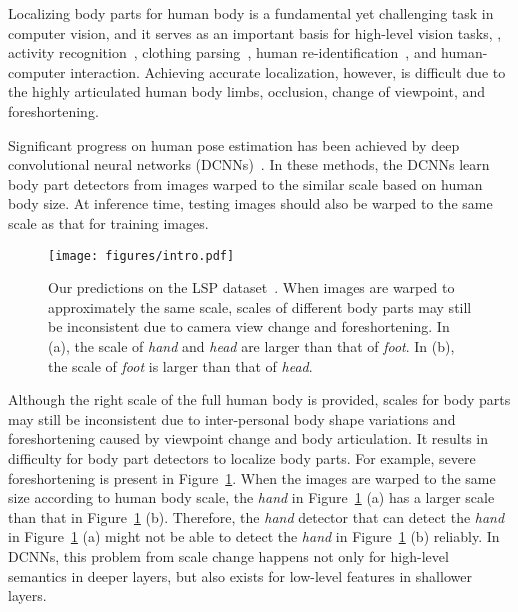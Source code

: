 \documentclass[10pt,twocolumn,letterpaper]{article}
\begin{document}
Localizing body parts for human body is a fundamental yet challenging task in computer vision, and it serves as an important basis for high-level vision tasks, \eg, activity recognition~\cite{yang2010recognizing,wang2013pose}, clothing parsing~\cite{yamaguchi2012parsing,yang2014clothing,liu2015matching}, human re-identification~\cite{zheng2017pose}, and human-computer interaction.
Achieving accurate localization, however, is difficult due to the highly articulated human body limbs, occlusion,  change of viewpoint, and foreshortening.

Significant progress on human pose estimation has been achieved by deep convolutional neural networks (DCNNs)~\cite{toshev2014deeppose,tompson2014joint,chen2014articulated,tompson2015efficient,pishchulin2016deepcut,wei2016convolutional,newell2016stacked}.  
In these methods, the DCNNs learn body part detectors from images warped to the similar scale based on human body size.  
At inference time, testing images should also be warped to the same scale as that for training images. 



\begin{figure}[t]
	\begin{center}
\texttt{[image: figures/intro.pdf]}
	\end{center}
	\vspace{-1em}
	\caption{Our predictions on the LSP dataset~\cite{Johnson10}. When images are warped to approximately the same scale, scales of different body parts may still be  inconsistent due to camera view change and foreshortening. In (a), the scale of \textit{hand} and \textit{head} are larger than that of \textit{foot}. In (b), the scale of \textit{foot} is larger than that of \textit{head}. }
	\label{fig:motivation}
	\vspace{-1em}
\end{figure}


Although the right scale of the full human body is provided, scales for body parts may still be inconsistent due to inter-personal body shape variations and foreshortening caused by viewpoint change and body articulation. It results in difficulty for body part detectors to localize body parts. 
For example, severe foreshortening is present in Figure~\ref{fig:motivation}. 
When the images are warped to the same size according to human body scale, the \textit{hand} in Figure~\ref{fig:motivation} (a) has a larger scale than that in Figure~\ref{fig:motivation} (b). Therefore, the \textit{hand} detector that can detect the \textit{hand} in Figure~\ref{fig:motivation} (a) might not be able to detect the \textit{hand} in Figure~\ref{fig:motivation} (b) reliably. In DCNNs, this problem from scale change happens not only for high-level semantics in deeper layers, but also exists for low-level features in shallower layers.
\end{document}
